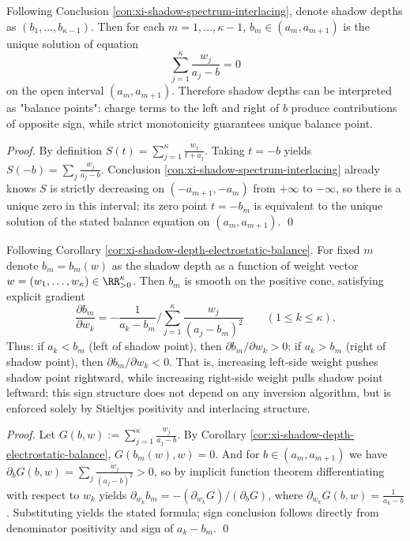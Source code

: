 \begin{corollary}\label{cor:xi-shadow-depth-electrostatic-balance}
Following Conclusion \ref{con:xi-shadow-spectrum-interlacing}, denote shadow depths as \((b_1,\dots,b_{\kappa-1})\).
Then for each \(m=1,\dots,\kappa-1\), \(b_m\in(a_m,a_{m+1})\) is the unique solution of equation
\[
\boxed{\;
\sum_{j=1}^{\kappa}\frac{w_j}{a_j-b}=0\;}
\]
on the open interval \((a_m,a_{m+1})\).
Therefore shadow depths can be interpreted as "balance points": charge terms to the left and right of \(b\) produce contributions of opposite sign, while strict monotonicity guarantees unique balance point.
\end{corollary}
\begin{proof}
By definition \(S(t)=\sum_{j=1}^{\kappa}\frac{w_j}{t+a_j}\).
Taking \(t=-b\) yields \(S(-b)=\sum_j \frac{w_j}{a_j-b}\).
Conclusion \ref{con:xi-shadow-spectrum-interlacing} already knows \(S\) is strictly decreasing on \((-a_{m+1},-a_m)\) from \(+\infty\) to \(-\infty\), so there is a unique zero in this interval; its zero point \(t=-b_m\) is equivalent to the unique solution of the stated balance equation on \((a_m,a_{m+1})\). \qed
\end{proof}

\begin{proposition}\label{prop:xi-shadow-depth-gradient-wrt-weights}
Following Corollary \ref{cor:xi-shadow-depth-electrostatic-balance}.
For fixed \(m\) denote \(b_m=b_m(w)\) as the shadow depth as a function of weight vector \(w=(w_1,\dots,w_\kappa)\in\RR_{>0}^\kappa\).
Then \(b_m\) is smooth on the positive cone, satisfying explicit gradient
\[
\boxed{\;
\frac{\partial b_m}{\partial w_k}
=-\frac{1}{a_k-b_m}\Bigg/\sum_{j=1}^{\kappa}\frac{w_j}{(a_j-b_m)^2}\qquad(1\le k\le \kappa).\;}
\]
Thus: if \(a_k<b_m\) (left of shadow point), then \(\partial b_m/\partial w_k>0\); if \(a_k>b_m\) (right of shadow point), then \(\partial b_m/\partial w_k<0\).
That is, increasing left-side weight pushes shadow point rightward, while increasing right-side weight pulls shadow point leftward; this sign structure does not depend on any inversion algorithm, but is enforced solely by Stieltjes positivity and interlacing structure.
\end{proposition}
\begin{proof}
Let
\(
G(b,w):=\sum_{j=1}^{\kappa}\frac{w_j}{a_j-b}
\).
By Corollary \ref{cor:xi-shadow-depth-electrostatic-balance}, \(G(b_m(w),w)=0\).
And for \(b\in(a_m,a_{m+1})\) we have
\(
\partial_b G(b,w)=\sum_j\frac{w_j}{(a_j-b)^2}>0
\),
so by implicit function theorem differentiating with respect to \(w_k\) yields
\(
\partial_{w_k}b_m=-(\partial_{w_k}G)/(\partial_bG)
\), where \(\partial_{w_k}G(b,w)=\frac{1}{a_k-b}\).
Substituting yields the stated formula; sign conclusion follows directly from denominator positivity and sign of \(a_k-b_m\). \qed
\end{proof}

